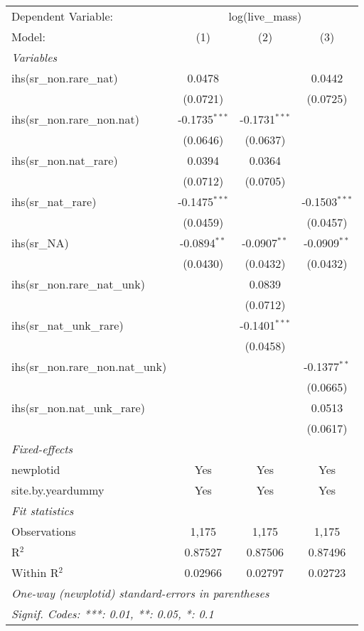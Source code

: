 \begin{tabular}{lccc}
\tabularnewline\midrule\midrule
Dependent Variable:&\multicolumn{3}{c}{log(live\_mass)}\\
Model:&(1) & (2) & (3)\\
\midrule \emph{Variables}&   &   &  \\
ihs(sr\_non.rare\_nat)&0.0478 &    & 0.0442\\
  &(0.0721) &    & (0.0725)\\
ihs(sr\_non.rare\_non.nat)&-0.1735$^{***}$ & -0.1731$^{***}$ &   \\
  &(0.0646) & (0.0637) &   \\
ihs(sr\_non.nat\_rare)&0.0394 & 0.0364 &   \\
  &(0.0712) & (0.0705) &   \\
ihs(sr\_nat\_rare)&-0.1475$^{***}$ &    & -0.1503$^{***}$\\
  &(0.0459) &    & (0.0457)\\
ihs(sr\_NA)&-0.0894$^{**}$ & -0.0907$^{**}$ & -0.0909$^{**}$\\
  &(0.0430) & (0.0432) & (0.0432)\\
ihs(sr\_non.rare\_nat\_unk)&   & 0.0839 &   \\
  &   & (0.0712) &   \\
ihs(sr\_nat\_unk\_rare)&   & -0.1401$^{***}$ &   \\
  &   & (0.0458) &   \\
ihs(sr\_non.rare\_non.nat\_unk)&   &    & -0.1377$^{**}$\\
  &   &    & (0.0665)\\
ihs(sr\_non.nat\_unk\_rare)&   &    & 0.0513\\
  &   &    & (0.0617)\\
\midrule \emph{Fixed-effects}&   &   &  \\
newplotid & Yes & Yes & Yes\\
site.by.yeardummy & Yes & Yes & Yes\\
\midrule \emph{Fit statistics}&  & & \\
Observations & 1,175&1,175&1,175\\
R$^2$ & 0.87527&0.87506&0.87496\\
Within R$^2$ & 0.02966&0.02797&0.02723\\
\midrule\midrule\multicolumn{4}{l}{\emph{One-way (newplotid) standard-errors in parentheses}}\\
\multicolumn{4}{l}{\emph{Signif. Codes: ***: 0.01, **: 0.05, *: 0.1}}\\
\end{tabular}


